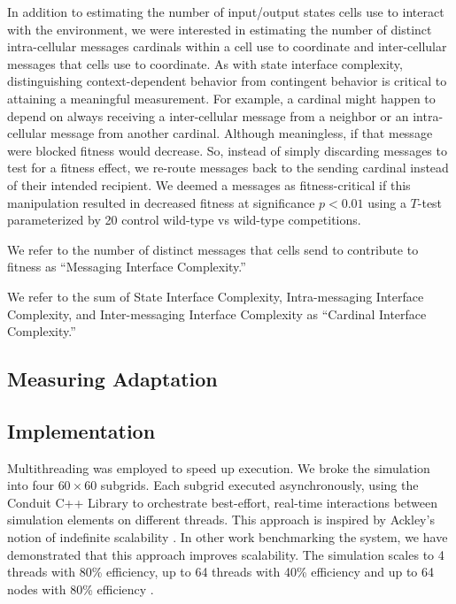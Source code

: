 In addition to estimating the number of input/output states cells use to interact with the environment, we were interested in estimating the number of distinct intra-cellular messages cardinals within a cell use to coordinate and inter-cellular messages that cells use to coordinate.
As with state interface complexity, distinguishing context-dependent behavior from contingent behavior is critical to attaining a meaningful measurement.
For example, a cardinal might happen to depend on always receiving a inter-cellular message from a neighbor or an intra-cellular message from another cardinal.
Although meaningless, if that message were blocked fitness would decrease.
So, instead of simply discarding messages to test for a fitness effect, we re-route messages back to the sending cardinal instead of their intended recipient.
We deemed a messages as fitness-critical if this manipulation resulted in decreased fitness at significance $p < 0.01$ using a $T$-test parameterized by 20 control wild-type vs wild-type competitions.

We refer to the number of distinct messages that cells send to contribute to fitness as ``Messaging Interface Complexity.''

We refer to the sum of State Interface Complexity, Intra-messaging Interface Complexity, and Inter-messaging Interface Complexity as ``Cardinal Interface Complexity.''

\subsection{Measuring Adaptation}
\label{sec:measuring-adaptatoin;ch:measuring-cna}



\subsection{Implementation}

Multithreading was employed to speed up execution.
We broke the simulation into four $60\times60$ subgrids.
Each subgrid executed asynchronously, using the Conduit C++ Library to orchestrate best-effort, real-time interactions between simulation elements on different threads.
This approach is inspired by Ackley's notion of indefinite scalability \citep{ackley2014indefinitely}.
In other work benchmarking the system, we have demonstrated that this approach improves scalability.
The simulation scales to 4 threads with 80\% efficiency, up to 64 threads with 40\% efficiency and up to 64 nodes with 80\% efficiency \citep{moreno2021conduit}.

